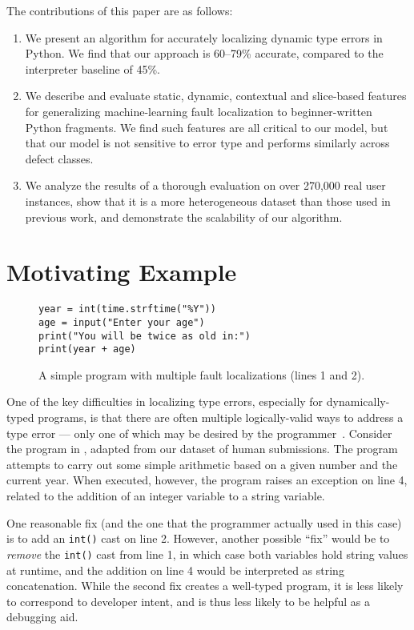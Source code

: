 \documentclass[conference]{IEEEtran}
\newcommand\lt[1]{{\lstinline|#1|}}
\begin{document}
The contributions of this paper are as follows:
\begin{enumerate}

\item We present an algorithm for accurately localizing dynamic type errors
in Python. We find that our approach is 60--79\% accurate, compared to
the interpreter baseline of 45\%.

\item We describe and evaluate static, dynamic, contextual and slice-based
features for generalizing machine-learning fault localization to
beginner-written Python fragments. We find such features are all critical
to our model, but that our model is not sensitive to error type and
performs similarly across defect classes.

\item We analyze the results of a thorough evaluation on over 270,000 real
user instances, show that it is a more heterogeneous dataset than those used
in previous work, and demonstrate the scalability of our algorithm.

\end{enumerate}

\section{Motivating Example}
\label{sec-motex}

\begin{figure}
\begin{lstlisting}
year = int(time.strftime("%Y"))
age = input("Enter your age")
print("You will be twice as old in:")
print(year + age)
\end{lstlisting}
\caption{
\label{fig-motex}
A simple program with multiple fault localizations (lines 1 and 2).}
\end{figure}

One of the key difficulties in localizing type errors, especially for
dynamically-typed programs, is that there are often multiple
logically-valid ways to address a type error --- only one of
which may be desired by the programmer~\cite{learning-to-blame}.  Consider the program
in , adapted from our dataset of human submissions. The
program attempts to carry out some simple arithmetic based on a given
number and the current year. When executed, however, the program raises an
exception on line 4, related to the addition of an integer variable to a
string variable.

One reasonable fix (and the one that the programmer actually used in this
case) is to add an \lt{int()} cast on line 2. However, another possible
``fix'' would be to \textit{remove} the \lt{int()} cast from line 1, in
which case both variables hold string values at runtime, and the addition
on line 4 would be interpreted as string concatenation. While the second
fix creates a well-typed program, it is less likely to correspond to
developer intent, and is thus less likely to be helpful as a debugging aid.
\end{document}
